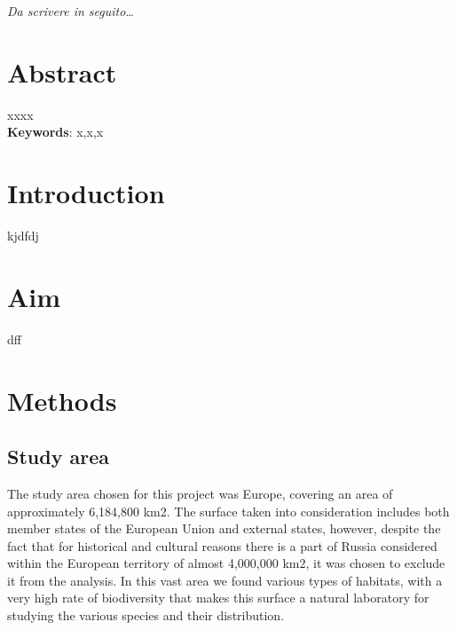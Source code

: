 \documentclass[12pt,a4paper]{article}
\begin{document}
\begin{titlepage}                      
%
\thispagestyle{empty}                   %
\topmargin=6.5cm                        %
\raggedleft                             %
\large                                  %
                                       
\em                                     %
Da scrivere in seguito\ldots                      %
\newpage                                
\clearpage{\pagestyle{empty}\cleardoublepage}%
\end{titlepage}
\linespread{1.2} 
\newpage
\tableofcontents
\linespread{1.5} 
\newpage
\section{Abstract}
 xxxx\\
 
 
\vspace{1cm}
\textbf{Keywords}: x,x,x

\newpage
\section{Introduction}
kjdfdj

\newpage
\section{Aim}
dff

\newpage
\section{Methods}
\subsection{Study area}
The study area chosen for this project was Europe, covering an area of approximately 6,184,800 km2.
The surface taken into consideration includes both member states of the European Union and external states, however, despite the fact that for historical and cultural reasons there is a part of Russia considered within the European territory of almost 4,000,000 km2, it was chosen to exclude it from the analysis.
In this vast area we found various types of habitats, with a very high rate of biodiversity that makes this surface a natural laboratory for studying the various species and their distribution.
\end{document}
